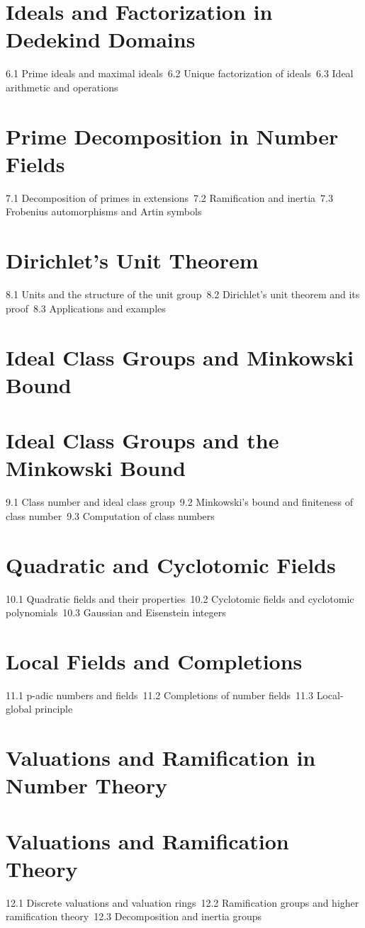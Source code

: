 \section{Ideals and Factorization in Dedekind Domains}
6.1 Prime ideals and maximal ideals\
6.2 Unique factorization of ideals\
6.3 Ideal arithmetic and operations\
\section{Prime Decomposition in Number Fields}
7.1 Decomposition of primes in extensions\
7.2 Ramification and inertia\
7.3 Frobenius automorphisms and Artin symbols\
\section{Dirichlet's Unit Theorem}
8.1 Units and the structure of the unit group\
8.2 Dirichlet's unit theorem and its proof\
8.3 Applications and examples\
\section{Ideal Class Groups and Minkowski Bound}
\section{Ideal Class Groups and the Minkowski Bound}
9.1 Class number and ideal class group\
9.2 Minkowski's bound and finiteness of class number\
9.3 Computation of class numbers\
\section{Quadratic and Cyclotomic Fields}
10.1 Quadratic fields and their properties\
10.2 Cyclotomic fields and cyclotomic polynomials\
10.3 Gaussian and Eisenstein integers\
\section{Local Fields and Completions}
11.1 p-adic numbers and fields\
11.2 Completions of number fields\
11.3 Local-global principle\
\section{Valuations and Ramification in Number Theory}
\section{Valuations and Ramification Theory}
12.1 Discrete valuations and valuation rings\
12.2 Ramification groups and higher ramification theory\
12.3 Decomposition and inertia groups\
